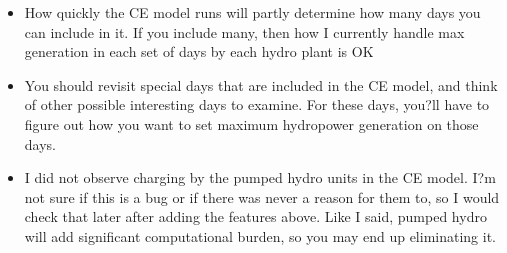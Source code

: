 \documentclass[11pt, oneside]{article}   	%
\begin{document}
\begin{itemize}
\item How quickly the CE model runs will partly determine how many days you can include in it. If you include many, then how I currently handle max generation in each set of days by each hydro plant is OK
\item You should revisit special days that are included in the CE model, and think of other possible interesting days to examine. For these days, you?ll have to figure out how you want to set maximum hydropower generation on those days. 
\item I did not observe charging by the pumped hydro units in the CE model. I?m not sure if this is a bug or if there was never a reason for them to, so I would check that later after adding the features above. Like I said, pumped hydro will add significant computational burden, so you may end up eliminating it.
\end{itemize}
\end{document}

